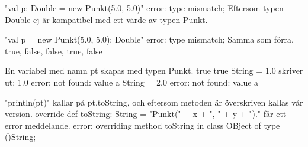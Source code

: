 "val p: Double = new Punkt(5.0, 5.0)" error: type mismatch;
Eftersom typen Double ej är kompatibel med ett värde av typen Punkt.

"val p = new Punkt(5.0, 5.0): Double" error: type mismatch;
Samma som förra.
\Subtask
true, false, false, true, false

\Task %
\Subtask
En variabel med namn pt skapas med typen Punkt.
true
true
String = 1.0
skriver ut: 1.0
error: not found: value a
String = 2.0
error: not found: value a

\Task %
\Subtask
"println(pt)" kallar på pt.toString, och eftersom metoden är överskriven kallas vår version.
\Subtask
override def toString: String = "Punkt(" + x + ", " + y + ")."
\Subtask
får ett error meddelande.
error: overriding method toString in class OBject of type ()String;

